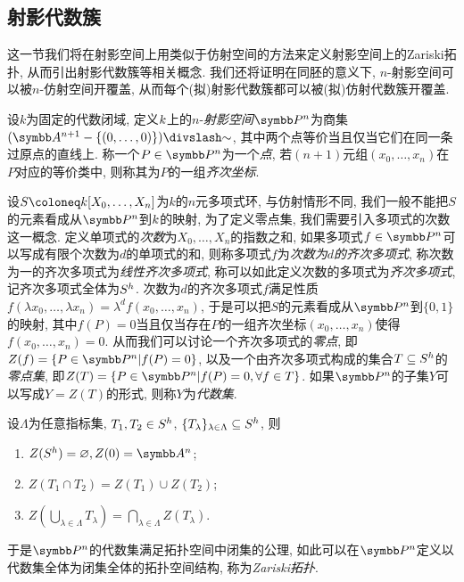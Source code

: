 \subsection{射影代数簇}

这一节我们将在射影空间上用类似于仿射空间的方法来定义射影空间上的Zariski拓扑, 从而引出射影代数簇等相关概念. 我们还将证明在同胚的意义下, $n$-射影空间可以被$n$-仿射空间开覆盖, 从而每个(拟)射影代数簇都可以被(拟)仿射代数簇开覆盖.

\begin{definition}
  设$k$为固定的代数闭域, 定义$k$上的$n$-\emph{射影空间}$\PP^n$为商集$(\AF^{n+1}-\{(0, \dotsc, 0)\}){\divslash}{\sim}$, 其中两个点等价当且仅当它们在同一条过原点的直线上. 称一个$P\in\PP^n$为一个\emph{点}, 若$(n+1)$元组$(x_0, \dotsc, x_n)$在$P$对应的等价类中, 则称其为$P$的一组\emph{齐次坐标}.
\end{definition}

\begin{definition}
  设$S\coloneq \kk [X_0, \dotsc, X_n]$为$k$的$n$元多项式环, 与仿射情形不同, 我们一般不能把$S$的元素看成从$\PP^n$到$k$的映射, 为了定义零点集, 我们需要引入多项式的次数这一概念. 定义单项式的\emph{次数}为$X_0, \dotsc, X_n$的指数之和, 如果多项式$f\in \PP^n$可以写成有限个次数为$d$的单项式的和, 则称多项式$f$为\emph{次数为$d$的齐次多项式}, 称次数为一的齐次多项式为\emph{线性齐次多项式}, 称可以如此定义次数的多项式为\emph{齐次多项式}, 记齐次多项式全体为$S^h$. 次数为$d$的齐次多项式$f$满足性质$f(\lambda x_0, \dotsc, \lambda x_n)=\lambda^d f(x_0, \dotsc, x_n)$, 于是可以把$S$的元素看成从$\PP^n$到$\{0, 1\}$的映射, 其中$f(P)=0$当且仅当存在$P$的一组齐次坐标$(x_0, \dotsc, x_n)$使得$f(x_0, \dotsc, x_n)=0$. 从而我们可以讨论一个齐次多项式的\emph{零点}, 即$Z(f)=\{P\in \PP^n\vert f(P)=0\}$, 以及一个由齐次多项式构成的集合$T\subseteq S^h$的\emph{零点集}, 即$Z(T)=\{P\in\PP^n\vert f(P)=0, \forall f\in T\}$. 如果$\PP^n$的子集$Y$可以写成$Y=Z(T)$的形式, 则称$Y$为\emph{代数集}.
\end{definition}

\begin{proposition}
  设$\Lambda$为任意指标集, $T_1, T_2\in S^h$, $\{T_\lambda\}_{\lambda\in\Lambda}\subseteq S^h$, 则
  \begin{enumerate}
    \item $Z(\Shomo)=\varnothing, Z(0)=\AF^n$;
    \item $Z(T_1\cap T_2)=Z(T_1)\cup Z(T_2)$;
    \item $Z(\bigcup_{\lambda\in\Lambda} T_\lambda)=\bigcap_{\lambda\in\Lambda} Z(T_\lambda)$.
  \end{enumerate}
  于是$\PP^n$的代数集满足拓扑空间中闭集的公理, 如此可以在$\PP^n$定义以代数集全体为闭集全体的拓扑空间结构, 称为\emph{Zariski拓扑}.
\end{proposition}

